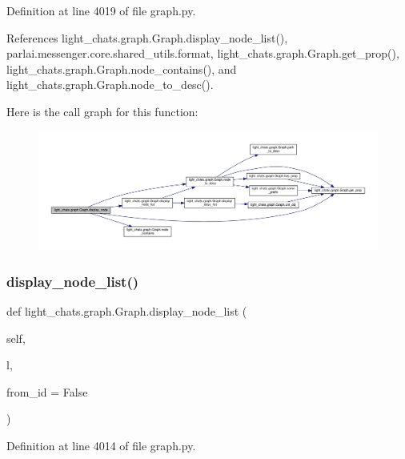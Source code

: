Definition at line 4019 of file graph.\+py.



References light\+\_\+chats.\+graph.\+Graph.\+display\+\_\+node\+\_\+list(), parlai.\+messenger.\+core.\+shared\+\_\+utils.\+format, light\+\_\+chats.\+graph.\+Graph.\+get\+\_\+prop(), light\+\_\+chats.\+graph.\+Graph.\+node\+\_\+contains(), and light\+\_\+chats.\+graph.\+Graph.\+node\+\_\+to\+\_\+desc().

Here is the call graph for this function\+:
\nopagebreak
\begin{figure}[H]
\begin{center}
\leavevmode
\includegraphics[width=350pt]{classlight__chats_1_1graph_1_1Graph_a34711f0bfabab728aa51d45bbde67580_cgraph}
\end{center}
\end{figure}
\mbox{\label{classlight__chats_1_1graph_1_1Graph_a9c3ce0d845610e465f9a5d9bee1cbd23}} 
\subsubsection{\texorpdfstring{display\+\_\+node\+\_\+list()}{display\_node\_list()}}
{\footnotesize\ttfamily def light\+\_\+chats.\+graph.\+Graph.\+display\+\_\+node\+\_\+list (\begin{DoxyParamCaption}\item[{}]{self,  }\item[{}]{l,  }\item[{}]{from\+\_\+id = {\ttfamily False} }\end{DoxyParamCaption})}



Definition at line 4014 of file graph.\+py.



